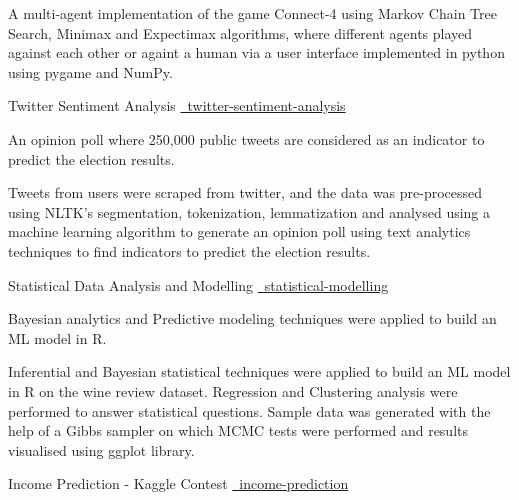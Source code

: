 \begin{cventries}
{\begin{cvitems}
{      }
      {
      A multi-agent implementation of the game Connect-4 using Markov Chain Tree Search, Minimax and Expectimax algorithms, where different agents played against each other or againt a human via a user interface implemented in python using pygame and NumPy.
      }
      \end{cvitems}
    }
  \cvproject
    {Twitter Sentiment Analysis}
    {
    {}
    {\href{https://github.com/mukeshmk/twitter-sentiment-analysis}{\faGithubSquare\ twitter-sentiment-analysis}}
    }
    {}
    {
      \begin{cvitems}
      \vspace{-0.5ex}
      {
      \item {An opinion poll where 250,000 public tweets are considered as an indicator to predict the election results.}
      }
      {
      Tweets from users were scraped from twitter, and the data was pre-processed using NLTK's segmentation, tokenization, lemmatization and analysed using a machine learning algorithm to generate an opinion poll using text analytics techniques to find indicators to predict the election results.
      }
      \end{cvitems}
    }
  \cvproject
    {Statistical Data Analysis and Modelling}
    {
    {}
    {\href{https://github.com/mukeshmk/statistical-modelling}{\faGithubSquare\ statistical-modelling}}
    }
    {}
    {
      \begin{cvitems}
      \vspace{-0.5ex}
      {
      \item {}Bayesian analytics and Predictive modeling techniques were applied to build an ML model in R.
      }
      {
      Inferential and Bayesian statistical techniques were applied to build an ML model in R on the wine review dataset. Regression and Clustering analysis were performed to answer statistical questions. Sample data was generated with the help of a Gibbs sampler on which MCMC tests were performed and results visualised using ggplot library.
      }
      \end{cvitems}
    }
  \cvproject
    {Income Prediction - Kaggle Contest}
    {
    {}
    {\href{https://github.com/mukeshmk/tcdml1920-income-ind}{\faGithubSquare\ income-prediction}}
}
\end{cventries}
